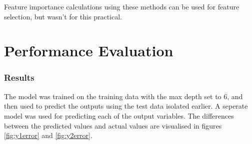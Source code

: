 \documentclass[12pt]{article}
\begin{document}
Feature importance calculations using these methods can be used for feature selection, but wasn't for this practical.

\FloatBarrier

\part{Performance Evaluation}

\section{Results}

The model was trained on the training data with the max depth set to 6, and then used to predict the outputs using the test data isolated earlier. A seperate model was used for predicting each of the output variables. The differences between the predicted values and actual values are visualised in figures \ref{fig:y1error} and \ref{fig:y2error}.
\end{document}
